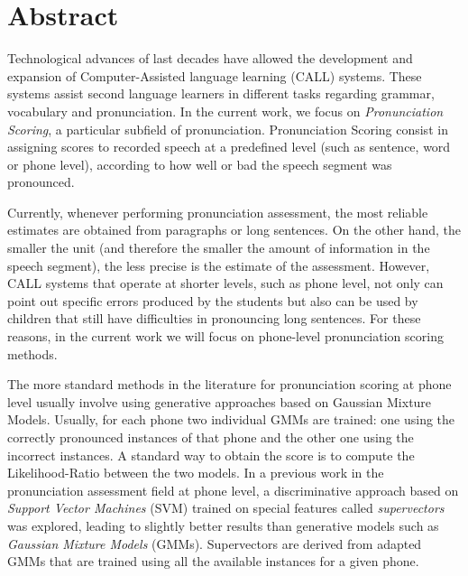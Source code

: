 \chapter*{Abstract}

\noindent
Technological advances of last decades have allowed the development and expansion
of Computer-Assisted language learning (CALL) systems. These systems assist
second language learners in different tasks regarding grammar, vocabulary and
pronunciation. In the current work, we focus on \textit{Pronunciation Scoring},
a particular subfield of pronunciation. Pronunciation Scoring consist in
assigning scores to recorded speech at a predefined
level (such as sentence, word or phone level), according to how well or bad
the speech segment was pronounced.

Currently, whenever performing pronunciation assessment, the most reliable estimates are
obtained from paragraphs or long sentences. On the other hand, the smaller the unit
(and therefore the smaller the amount of information in the speech segment),
the less precise is
the estimate of the assessment.
However, CALL systems that operate at shorter levels, such
as phone level,
not only can point out specific errors produced by the students but also
can be used by children that still have difficulties in pronouncing long sentences.
For these reasons,
in the current work we will focus on phone-level pronunciation scoring methods.


The more standard methods in the literature for pronunciation scoring at
phone level usually involve using generative approaches
based on Gaussian Mixture Models.
Usually, for each phone two individual GMMs are trained: one using the correctly
pronounced instances of that phone and the other one using the incorrect instances.
A standard way to obtain the score is to compute the
Likelihood-Ratio between the two models.
In a previous work in the pronunciation assessment field at phone level, a discriminative
approach based on \textit{Support Vector Machines} (SVM) trained on special features
called \textit{supervectors} was explored, leading to slightly better results than
generative models such as \textit{Gaussian Mixture Models} (GMMs). Supervectors
are derived from adapted GMMs that are trained using all the available
instances for a given phone.


